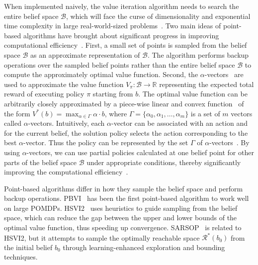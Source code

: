 \documentclass[orivec]{llncs}
\newcommand{\reals}{\mathbb{R}}
\newcommand{\beliefs}{\mathcal{B}}
\newcommand{\policy}{\pi}
\begin{document}
When implemented naively, the value iteration algorithm needs to search the entire belief space $\beliefs$, which will face the curse of dimensionality and exponential time complexity in large real-world-sized problems~\cite{ASurveyofPBPOMDP}. 
Two main ideas of point-based algorithms have brought about significant progress in improving computational efficiency~\cite{MCVI}. 
First, a small set of points is sampled from the belief space $\beliefs$ as an approximate representation of $\beliefs$. 
The algorithm performs backup operations over the sampled belief points rather than the entire belief space $\beliefs$ to compute the approximately optimal value function. 
Second, the $\alpha$-vectors~\cite{sarsop} are used to approximate the value function $V_{\policy} \colon \beliefs \to \reals$ representing the expected total reward of executing policy $\policy$ starting from $b$.
The optimal value function can be arbitrarily closely approximated by a piece-wise linear and convex function~\cite{Sondik78} of the form 
$
	V^{*}(b) = \max_{\alpha \in \Gamma} \alpha \cdot b
$,
where $\Gamma = \{\alpha_{0}, \alpha_{1}, \dotsc, \alpha_{m}\}$ is a set of $m$ vectors called $\alpha$-vectors.
Intuitively, each $\alpha$-vector can be associated with an action and for the current belief, the solution policy selects the action corresponding to the best $\alpha$-vector.
Thus the policy can be represented by the set $\Gamma$ of $\alpha$-vectors~\cite{sarsop}.
By using $\alpha$-vectors, we can use partial policies calculated at one belief point for other parts of the belief space $\beliefs$ under appropriate conditions, thereby significantly improving the computational efficiency~\cite{ASurveyofPBPOMDP}.

Point-based algorithms differ in how they sample the belief space and perform backup operations. 
PBVI~\cite{PBVI} has been the first point-based algorithm to work well on large POMDPs. 
HSVI2~\cite{PBVII} uses heuristics to guide sampling from the belief space, which can reduce the gap between the upper and lower bounds of the optimal value function, thus speeding up convergence. 
SARSOP~\cite{sarsop} is related to HSVI2, but it attempts to sample the optimally reachable space $\mathcal{R}^{*}(b_{0})$ from the initial belief $b_{0}$ through learning-enhanced exploration and bounding techniques.
\end{document}
